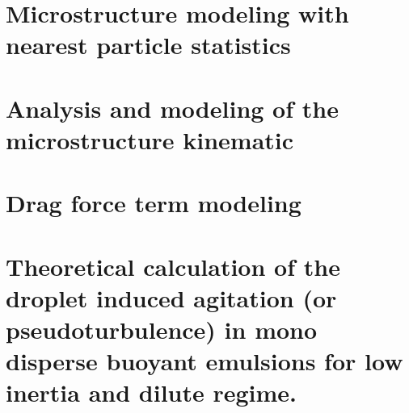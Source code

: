\documentclass[12pt,a4paper]{My_book}
\begin{document}

\chapter{Microstructure modeling with nearest particle statistics}
\localtableofcontents








\chapter{Analysis and modeling of the microstructure kinematic}
\localtableofcontents
















\chapter{Drag force term modeling}
\label{chap:mono-disperse}
\localtableofcontents





\chapter{Theoretical calculation of the droplet induced agitation (or pseudoturbulence) in mono disperse buoyant emulsions for low inertia and dilute regime.}
\localtableofcontents




% 
\end{document}
